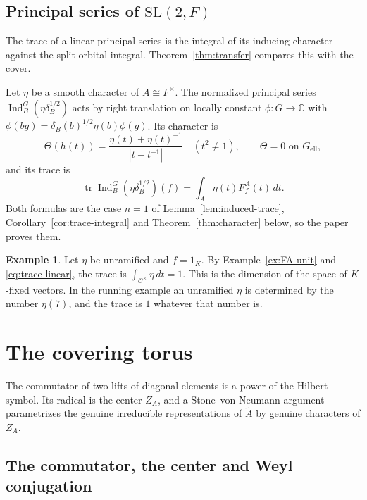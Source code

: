 \documentclass[12pt,letterpaper]{article}
\numberwithin{equation}{section}
\theoremstyle{plain}
\theoremstyle{definition}
\newtheorem{example}[theorem]{Example}
\theoremstyle{remark}
\newcommand{\At}{\widetilde A}
\newcommand{\Cc}{\mathbb C}
\newcommand{\Of}{\mathcal O}
\newcommand{\ZA}{Z_A}
\DeclareMathOperator{\Ind}{Ind}
\DeclareMathOperator{\tr}{tr}
\newcommand{\SL}{\mathrm{SL}}
\begin{document}
\subsection{Principal series of \texorpdfstring{$\SL(2,F)$}{SL(2,F)}}\label{subsec:ps-linear}

The trace of a linear principal series is the integral of its
inducing character against the split orbital integral.
Theorem~\ref{thm:transfer} compares this with the cover.

Let $\eta$ be a smooth character of $A\cong F^\times$. The normalized
principal series $\Ind_B^G(\eta\delta_B^{1/2})$ acts by right
translation on locally constant $\phi:G\to\Cc$ with
$\phi(bg)=\delta_B(b)^{1/2}\eta(b)\phi(g)$. Its character is
\begin{equation}\label{eq:char-linear}
\Theta(h(t))=\frac{\eta(t)+\eta(t)^{-1}}{|t-t^{-1}|}\quad(t^2\ne1),
\qquad \Theta=0\text{ on }G_{\mathrm{ell}},
\end{equation}
and its trace is
\begin{equation}\label{eq:trace-linear}
\tr\Ind_B^G(\eta\delta_B^{1/2})(f)=\int_A\eta(t)F_f^A(t)\,dt .
\end{equation}
Both formulas are the case $n=1$ of Lemma~\ref{lem:induced-trace},
Corollary~\ref{cor:trace-integral} and Theorem~\ref{thm:character}
below, so the paper proves them.

\begin{example}\label{ex:trace-linear}
Let $\eta$ be unramified and $f=1_K$. By Example~\ref{ex:FA-unit} and
\eqref{eq:trace-linear}, the trace is $\int_{\Of^\times}\eta\,dt=1$.
This is the dimension of the space of $K$-fixed vectors. In the running
example an unramified $\eta$ is determined by the number $\eta(7)$, and
the trace is $1$ whatever that number is.
\end{example}

\section{The covering torus}\label{sec:torus}

The commutator of two lifts of diagonal elements is a power of the
Hilbert symbol. Its radical is the center $\ZA$, and a Stone--von
Neumann argument parametrizes the genuine irreducible representations
of $\At$ by genuine characters of $\ZA$.

\subsection*{The commutator, the center and Weyl conjugation}
\end{document}
